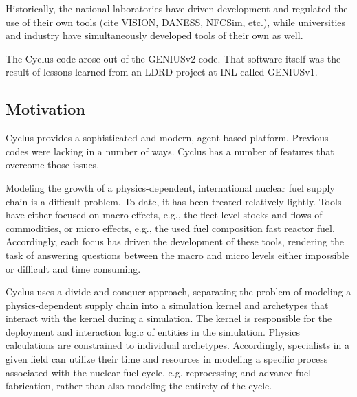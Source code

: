 Historically, the national laboratories have driven development and regulated 
the use of their own tools (cite VISION, DANESS, NFCSim, etc.), while 
universities and industry have simultaneously developed tools of their own as 
well. 

The Cyclus code arose out of the GENIUSv2 code. That software itself was the 
result of lessons-learned from an LDRD project at INL called GENIUSv1. 


\subsection{Motivation}


Cyclus provides a sophisticated and modern, agent-based platform. Previous 
codes were lacking in a number of ways. Cyclus has a number of features that 
overcome those issues.  


Modeling the growth of a physics-dependent, international nuclear fuel supply
chain is a difficult problem. To date, it has been treated relatively
lightly. Tools have either focused on macro effects, e.g., the fleet-level
stocks and flows of commodities, or micro effects, e.g., the used fuel
composition fast reactor fuel. Accordingly, each focus has driven the
development of these tools, rendering the task of answering questions between
the macro and micro levels either impossible or difficult and time consuming. 

Cyclus uses a divide-and-conquer approach, separating the problem of modeling a
physics-dependent supply chain into a simulation kernel and archetypes that
interact with the kernel during a simulation. The kernel is responsible for the
deployment and interaction logic of entities in the simulation. Physics
calculations are constrained to individual archetypes. Accordingly, specialists
in a given field can utilize their time and resources in modeling a specific
process associated with the nuclear fuel cycle, e.g. reprocessing and advance
fuel fabrication, rather than also modeling the entirety of the cycle.

